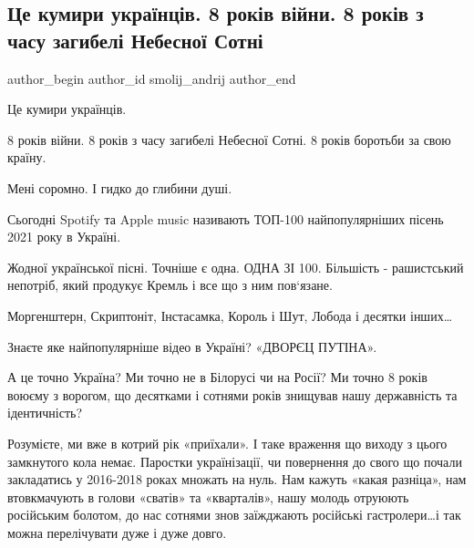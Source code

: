  
 
 
 
 
 
\subsection{Це кумири українців. 8 років війни. 8 років з часу загибелі Небесної Сотні}
\label{sec:02_12_2021.fb.smolij_andrij.1.kumiry}
 
\ifcmt
 author_begin
   author_id smolij_andrij
 author_end
\fi

Це кумири українців. 

8 років війни. 8 років з часу загибелі Небесної Сотні. 8 років боротьби за свою
країну.

Мені соромно. І гидко до глибини душі. 

Сьогодні Spotify та Apple music називають ТОП-100 найпопулярніших пісень 2021
року в Україні. 


Жодної української пісні. Точніше є одна. ОДНА ЗІ 100. Більшість - рашистський
непотріб, який продукує Кремль і все що з ним пов‘язане. 

Моргенштерн, Скриптоніт, Інстасамка, Король і Шут, Лобода і десятки інших…

Знаєте яке найпопулярніше відео в Україні? «ДВОРЄЦ ПУТІНА». 

А це точно Україна? Ми точно не в Білорусі чи на Росії? Ми точно 8 років воюєму
з ворогом, що десятками і сотнями років знищував нашу державність та
ідентичність? 

Розумієте, ми вже в котрий рік «приїхали». І таке враження що виходу з цього
замкнутого кола немає. Паростки українізації, чи повернення до свого що почали
закладатись у 2016-2018 роках множать на нуль. Нам кажуть «какая разніца», нам
втовкмачують в голови «сватів» та «кварталів», нашу молодь отруюють російським
болотом, до нас сотнями знов заїжджають російські гастролери…і так можна
перелічувати дуже і дуже довго. 

